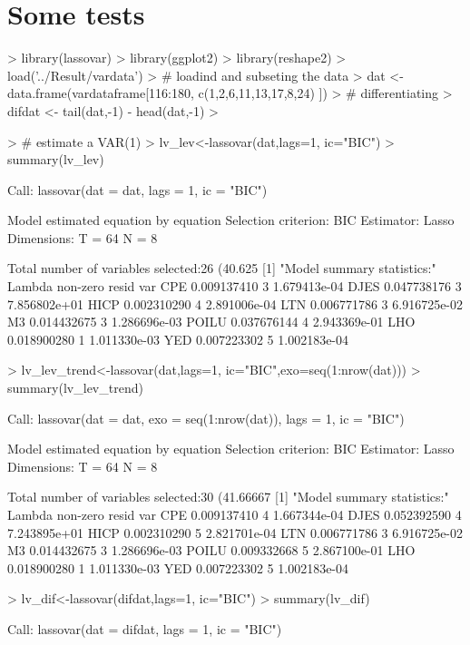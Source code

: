 \documentclass[11pt,oneside, a4paper]{amsart}
\begin{document}
\section*{Some tests}


\begin{Schunk}
\begin{Sinput}
> library(lassovar)
> library(ggplot2)
> library(reshape2)
> load('../Result/vardata')
> # loadind and subseting the data
> dat <- data.frame(vardataframe[116:180, c(1,2,6,11,13,17,8,24) ])
> # differentiating
> difdat <- tail(dat,-1) - head(dat,-1)
> 
\end{Sinput}
\end{Schunk}

\begin{Schunk}
\begin{Sinput}
> # estimate a VAR(1)
> lv_lev<-lassovar(dat,lags=1, ic="BIC")
> summary(lv_lev)
\end{Sinput}
\begin{Soutput}
Call:
lassovar(dat = dat, lags = 1, ic = "BIC")

Model estimated equation by equation
Selection criterion: BIC
Estimator: Lasso
Dimensions: T = 64  N = 8

Total number of variables selected:26 (40.625% of candidates)
[1] "Model summary statistics:"
           Lambda non-zero    resid var
CPE   0.009137410        3 1.679413e-04
DJES  0.047738176        3 7.856802e+01
HICP  0.002310290        4 2.891006e-04
LTN   0.006771786        3 6.916725e-02
M3    0.014432675        3 1.286696e-03
POILU 0.037676144        4 2.943369e-01
LHO   0.018900280        1 1.011330e-03
YED   0.007223302        5 1.002183e-04
\end{Soutput}
\begin{Sinput}
> lv_lev_trend<-lassovar(dat,lags=1, ic="BIC",exo=seq(1:nrow(dat)))
> summary(lv_lev_trend)
\end{Sinput}
\begin{Soutput}
Call:
lassovar(dat = dat, exo = seq(1:nrow(dat)), lags = 1, ic = "BIC")

Model estimated equation by equation
Selection criterion: BIC
Estimator: Lasso
Dimensions: T = 64  N = 8

Total number of variables selected:30 (41.66667% of candidates)
[1] "Model summary statistics:"
           Lambda non-zero    resid var
CPE   0.009137410        4 1.667344e-04
DJES  0.052392590        4 7.243895e+01
HICP  0.002310290        5 2.821701e-04
LTN   0.006771786        3 6.916725e-02
M3    0.014432675        3 1.286696e-03
POILU 0.009332668        5 2.867100e-01
LHO   0.018900280        1 1.011330e-03
YED   0.007223302        5 1.002183e-04
\end{Soutput}
\begin{Sinput}
> lv_dif<-lassovar(difdat,lags=1, ic="BIC")
> summary(lv_dif)
\end{Sinput}
\begin{Soutput}
Call:
lassovar(dat = difdat, lags = 1, ic = "BIC")


\end{Soutput}
\end{Schunk}
\end{document}
